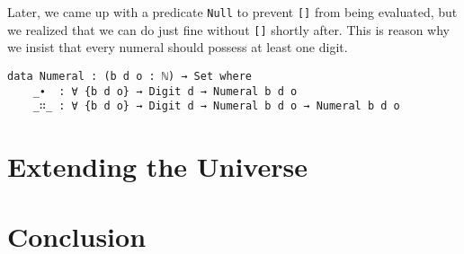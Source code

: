 \documentclass[\main/thesis.tex]{subfiles}
\begin{document}
Later, we came up with a predicate \lstinline|Null| to prevent \lstinline|[]|
from being evaluated, but we realized that we can do just fine without
\lstinline|[]| shortly after.
This is reason why we insist that every numeral should possess at least one
digit.

\begin{lstlisting}
data Numeral : (b d o : ℕ) → Set where
    _∙  : ∀ {b d o} → Digit d → Numeral b d o
    _∷_ : ∀ {b d o} → Digit d → Numeral b d o → Numeral b d o
\end{lstlisting}

\section{Extending the Universe}

\section{Conclusion}
\end{document}
